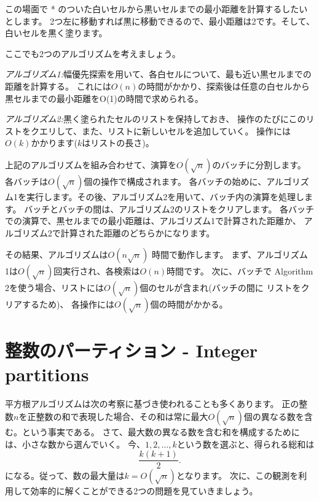 この場面で * のついた白いセルから黒いセルまでの最小距離を計算するしたいとします。
2つ左に移動すれば黒に移動できるので、最小距離は2です。そして、白いセルを黒く塗ります。

\begin{center}
\end{center}

ここでも2つのアルゴリズムを考えましょう。

\emph{アルゴリズム1:}幅優先探索を用いて、各白セルについて、最も近い黒セルまでの距離を計算する。
これには$O(n)$の時間がかかり、探索後は任意の白セルから黒セルまでの最小距離をO(1)の時間で求められる。

\emph{アルゴリズム2:}黒く塗られたセルのリストを保持しておき、
操作のたびにこのリストをクエリして、また、リストに新しいセルを追加していく。
操作には$O(k)$かかります($k$はリストの長さ)。

上記のアルゴリズムを組み合わせて、演算を$O(\sqrt n)$のバッチに分割します。
各バッチは$O(\sqrt n)$個の操作で構成されます。
各バッチの始めに、アルゴリズム1を実行します。その後、アルゴリズム2を用いて、バッチ内の演算を処理します。
バッチとバッチの間は、アルゴリズム2のリストをクリアします。
各バッチでの演算で、黒セルまでの最小距離は、アルゴリズム1で計算された距離か、 アルゴリズム2で計算された距離のどちらかになります。

その結果、アルゴリズムは$O(n \sqrt n)$ 時間で動作します。
まず、アルゴリズム 1は$O(\sqrt n)$回実行され、各検索は$O(n)$時間です。
次に、バッチで Algorithm 2を使う場合、リストには$O(\sqrt n)$個のセルが含まれ(バッチの間に リストをクリアするため)、
各操作には$O(\sqrt n)$個の時間がかかる。


\section{整数のパーティション - Integer partitions}

平方根アルゴリズムは次の考察に基づき使われることも多くあります。
正の整数$n$を正整数の和で表現した場合、その和は常に最大$O(\sqrt n)$個の異なる数を含む。という事実である。
さて、最大数の異なる数を含む和を構成するためには、小さな数から選んでいく。
今、$1,2,\ldots,k$という数を選ぶと、得られる総和は
\[\frac{k(k+1)}{2}.\]
になる。従って、数の最大量は$k = O(\sqrt n)$となります。
次に、この観測を利用して効率的に解くことができる2つの問題を見ていきましょう。

